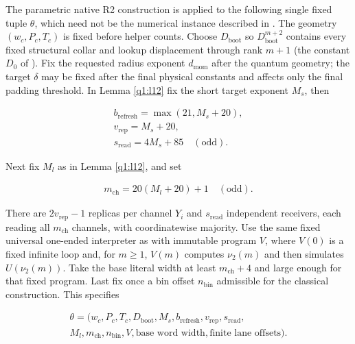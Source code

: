\begin{lemma}\label{q1:l11}

The parametric native R2 construction is applied to the following single fixed tuple \(\theta\), which need not be the numerical instance described in \cite{DMNoise1D2026}. The geometry \((w_{c},P_{c},T_{c})\) is fixed before helper counts. Choose \(D_{\mathrm{boot}}\) so \(D_{\mathrm{boot}}^{m+2}\) contains every fixed structural collar and lookup displacement through rank \(m+1\) (the constant \(D_0\) of \cite[Section~\ref*{cl:sec:stripes} and the proof of Lemma~\ref*{cl:lem:locking}]{DMNoise1D2026}). Fix the requested radius exponent \(d_{\mathrm{mom}}\) after the quantum geometry; the target \(\delta\) may be fixed after the final physical constants and affects only the final padding threshold. In Lemma \ref{q1:l12} fix the short target exponent \(M_{s}\), then

\[
\begin{gathered}
b_{\mathrm{refresh}} = \max (21,M_{s}+20), \\ v_{\mathrm{rep}} = M_{s}+20, \\ s_{\mathrm{read}} = 4 M_{s}+85\quad (\mathrm{odd}).
\end{gathered}
\]

Next fix \(M_{l}\) as in Lemma \ref{q1:l12}, and set

\[
\begin{gathered}
m_{\mathrm{ch}} = 20(M_{l}+20)+1\quad (\mathrm{odd}).
\end{gathered}
\]

There are \(2v_{\mathrm{rep}}-1\) replicas per channel \(Y_{i}\) and \(s_{\mathrm{read}}\) independent receivers, each reading all \(m_{\mathrm{ch}}\) channels, with coordinatewise majority. Use the same fixed universal one-ended interpreter as \cite[Section~\ref*{cl:sec:parameter}]{DMNoise1D2026} with immutable program \(V\), where \(V(0)\) is a fixed infinite loop and, for \(m\ge 1\), \(V(m)\) computes \(\nu_{2}(m)\) and then simulates \(U(\nu_{2}(m))\). Take the base literal width at least \(m_{\mathrm{ch}}+4\) and large enough for that fixed program. Last fix once a bin offset \(n_{\mathrm{bin}}\) admissible for the classical construction. This specifies

\[
\begin{gathered}
\theta=(w_{c},P_{c},T_{c},D_{\mathrm{boot}},M_{s},b_{\mathrm{refresh}},v_{\mathrm{rep}},s_{\mathrm{read}}, \\ M_{l},m_{\mathrm{ch}},n_{\mathrm{bin}},V,\text{base word width},\text{finite lane offsets}).
\end{gathered}
\]


\end{lemma}
